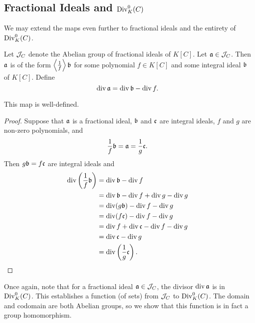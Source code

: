 \subsection{Fractional Ideals and $\Div_K^0(C)$}

We may extend the maps even further to fractional ideals and the entirety of $\Div_K^0(C)$.

Let $\cal J_C$ denote the Abelian group of fractional ideals of $K[C]$.
Let $\frak a \in \cal J_C$.
Then $\frak a$ is of the form $\pid{\frac 1 f} \frak b$ for some polynomial $f \in K[C]$ and some integral ideal $\frak b$ of $K[C]$.
Define
\[ \div \frak a = \div \frak b - \div f. \]

\begin{proposition}
  This map is well-defined.
\end{proposition}
\begin{proof}
  Suppose that $\frak a$ is a fractional ideal,
  $\frak b$ and $\frak c$ are integral ideals,
  $f$ and $g$ are non-zero polynomials, and
    \[ \frac 1 f \frak b = \frak a = \frac 1 g \frak c. \]
  Then $g \frak b = f \frak c$ are integral ideals and
  \begin{align*}
    \div \left( \frac 1 f \frak b \right)
      &= \div \frak b - \div f \\
      &= \div \frak b - \div f + \div g - \div g \\
      &= \div (g \frak b) - \div f - \div g \\
      &= \div (f \frak c) - \div f - \div g \\
      &= \div f + \div \frak c - \div f - \div g \\
      &= \div \frak c - \div g \\
      &= \div \left( \frac 1 g \frak c \right).
  \end{align*}
\end{proof}

Once again, note that for a fractional ideal $\frak a \in \cal J_C$,
the divisor $\div \frak a$ is in $\Div_K^0(C)$.
This establishes a function (of sets) from $\cal J_C$ to $\Div_K^0(C)$.
The domain and codomain are both Abelian groups, so we show that this function is in fact a group homomorphism.

